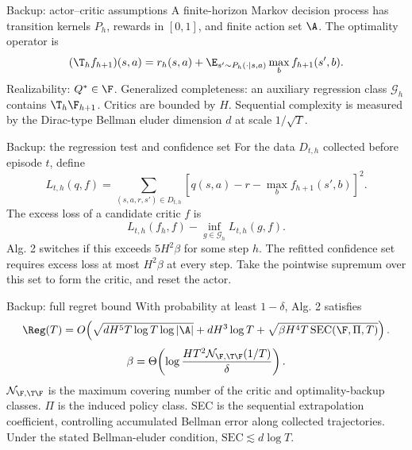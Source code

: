 
\begin{frame}{Backup: actor--critic assumptions}
A finite-horizon Markov decision process has transition kernels $P_h$, rewards in $[0,1]$, and finite action set $\A$.
\gap The optimality operator is
\[
(\T_h f_{h+1})(s,a)=r_h(s,a)+\E_{s'\sim P_h(\cdot\mid s,a)}\max_b f_{h+1}(s',b).
\]
Realizability: $Q^*\in\F$.\gap
Generalized completeness: an auxiliary regression class $\mathcal G_h$ contains $\T_h\F_{h+1}$.\gap
Critics are bounded by $H$. Sequential complexity is measured by the Dirac-type Bellman eluder dimension $d$ at scale $1/\sqrt T$.
\src{\paperac}
\end{frame}

\begin{frame}{Backup: the regression test and confidence set}
For the data $D_{t,h}$ collected before episode $t$, define
\[
L_{t,h}(q,f)=\sum_{(s,a,r,s')\in D_{t,h}}\left[q(s,a)-r-\max_b f_{h+1}(s',b)\right]^2.
\]
The excess loss of a candidate critic $f$ is
\[
L_{t,h}(f_h,f)-\inf_{g\in\mathcal G_h}L_{t,h}(g,f).
\]
Alg. 2 switches if this exceeds $5H^2\beta$ for some step $h$.\gap
The refitted confidence set requires excess loss at most $H^2\beta$ at every step. Take the pointwise supremum over this set to form the critic, and reset the actor.
\end{frame}

\begin{frame}{Backup: full regret bound}
With probability at least $1-\delta$, Alg. 2 satisfies
\[
\Reg(T)=O\!\left(
\sqrt{dH^5T\log T\log|\A|}+dH^3\log T
+\sqrt{\beta H^4T\,\mathrm{SEC}(\F,\Pi,T)}\right).
\]
\[
\beta=\Theta\!\left(\log\frac{HT^2\mathcal N_{\F,\T\F}(1/T)}{\delta}\right).
\]
$\mathcal N_{\F,\T\F}$ is the maximum covering number of the critic and optimality-backup classes.\gap
$\Pi$ is the induced policy class. SEC is the sequential extrapolation coefficient, controlling accumulated Bellman error along collected trajectories.\gap
Under the stated Bellman-eluder condition, $\mathrm{SEC}\lesssim d\log T$.
\src{\paperac}
\end{frame}


